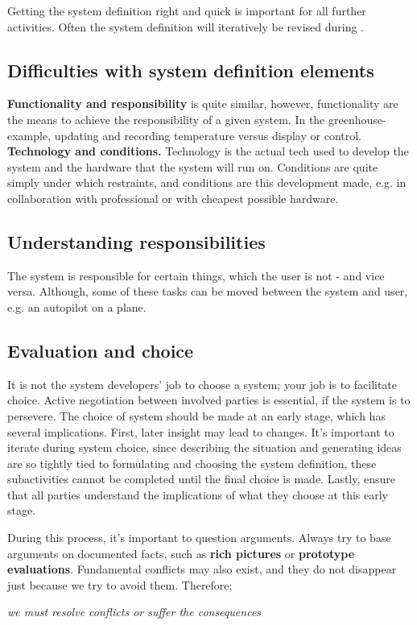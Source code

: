 Getting the system definition right and quick is important for all further activities. Often the system definition will iteratively be revised during \ad.

\subsection{Difficulties with system definition elements}
\textbf{Functionality and responsibility} is quite similar, however, functionality are the means to achieve the responsibility of a given system. In the greenhouse-example, updating and recording temperature versus display or control.
\textbf{Technology and conditions.} Technology is the actual tech used to develop the system and the hardware that the system will run on. Conditions are quite simply under which restraints, and conditions are this development made, e.g. in collaboration with professional or with cheapest possible hardware.

\subsection{Understanding responsibilities}
The system is responsible for certain things, which the user is not - and vice versa. Although, some of these tasks can be moved between the system and user, e.g. an autopilot on a plane.

\subsection{Evaluation and choice}
It is not the system developers' job to choose a system; your job is to facilitate choice. Active negotiation between involved parties is essential, if the system is to persevere. The choice of system should be made at an early stage, which has several implications. First, later insight may lead to changes. It's important to iterate during system choice, since describing the situation and generating ideas are so tightly tied to formulating and choosing the system definition, these subactivities cannot be completed until the final choice is made. Lastly, ensure that all parties understand the implications of what they choose at this early stage.

During this process, it's important to question arguments. Always try to base arguments on documented facts, such as \textbf{rich pictures} or \textbf{prototype evaluations}. Fundamental conflicts may also exist, and they do not disappear just because we try to avoid them. Therefore; 
\begin{center}
    \textit{we must resolve conflicts or suffer the consequences}
\end{center}

